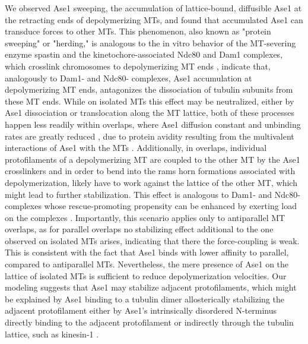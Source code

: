 We observed Ase1 sweeping, the accumulation of lattice-bound, diffusible Ase1 at the retracting ends of depolymerizing MTs, and found that accumulated Ase1 can transduce forces to other MTs. This phenomenon, also known as "protein sweeping" or "herding," is analogous to the in vitro behavior of the MT-severing enzyme spastin and the kinetochore-associated Ndc80 and Dam1 complexes, which crosslink chromosomes to depolymerizing MT ends \parencite{Franck2007, umbreit2012ndc80, grishchuk2017biophysics}, indicate that, analogously to Dam1- and Ndc80- complexes, Ase1 accumulation at depolymerizing MT ends, antagonizes the dissociation of tubulin subunits from these MT ends. While on isolated MTs this effect may be neutralized, either by Ase1 dissociation or translocation along the MT lattice, both of these processes happen less readily within overlaps, where Ase1 diffusion constant and unbinding rates are greatly reduced \parencite{Kapitein2008, lanskydiffusible2015}, due to protein avidity resulting from the multivalent interactions of Ase1 with the MTs \parencite{braun2020cytoskeletal, erlendsson2021binding}. Additionally, in overlaps, individual protofilaments of a depolymerizing MT are coupled to the other MT by the Ase1 crosslinkers and in order to bend into the rams horn formations associated with depolymerization, likely have to work against the lattice of the other MT, which might lead to further stabilization. This effect is analogous to Dam1- and Ndc80- complexes whose rescue-promoting propensity can be enhanced by exerting load on the complexes \parencite{Franck2007, volkov2018multivalency}. Importantly, this scenario applies only to antiparallel MT overlaps, as for parallel overlaps no stabilizing effect additional to the one observed on isolated MTs arises, indicating that there the force-coupling is weak. This is consistent with the fact that Ase1 binds with lower affinity to parallel, compared to antiparallel MTs. Nevertheless, the mere presence of Ase1 on the lattice of isolated MTs is sufficient to reduce depolymerization velocities. Our modeling suggests that Ase1 may stabilize adjacent protofilaments, which might be explained by Ase1 binding to a tubulin dimer allosterically stabilizing the adjacent protofilament either by Ase1's intrinsically disordered N-terminus directly binding to the adjacent protofilament \parencite{Subramanian2010} or indirectly through the tubulin lattice, such as kinesin-1 \parencite{Peet2018, morikawa2015x}. \par

